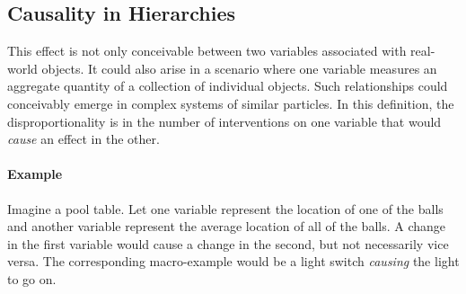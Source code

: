 \documentclass{article}
\begin{document}
\subsection{Causality in Hierarchies}
This effect is not only conceivable between two variables associated with real-world objects. It could also arise in a scenario where one variable measures an aggregate quantity of a collection of individual objects. Such relationships could conceivably emerge in complex systems of similar particles. In this definition, the disproportionality is in the number of interventions on one variable that would \emph{cause} an effect in the other.

\paragraph{Example} Imagine a pool table. Let one variable represent the location of one of the balls and another variable represent the average location of all of the balls. A change in the first variable would cause a change in the second, but not necessarily vice versa. The corresponding macro-example would be a light switch \emph{causing} the light to go on.


\clearpage

\end{document}
